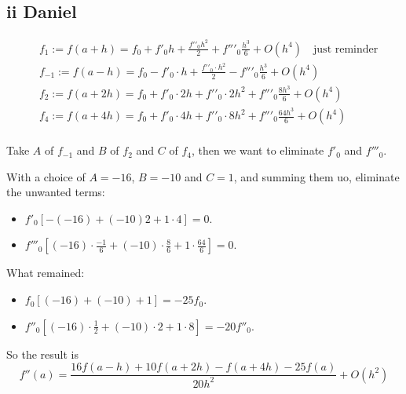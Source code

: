 \documentclass{article}
\begin{document}
\subsection{ii Daniel}

\begin{align}
     & {{f}_{1}}:=f\left( a+h \right)={{f}_{0}}+f{{'}_{0}}h+\frac{f'{{'}_{0}}{{h}^{2}}}{2}+f''{{'}_{0}}\frac{{{h}^{3}}}{6}+O\left( {{h}^{4}} \right)\quad \text{just reminder} \\
     & {{f}_{-1}}:=f\left( a-h \right)={{f}_{0}}-f{{'}_{0}}\cdot h+\frac{f'{{'}_{0}}\cdot {{h}^{2}}}{2}-f''{{'}_{0}}\frac{{{h}^{3}}}{6}+O\left( {{h}^{4}} \right)              \\
     & {{f}_{2}}:=f\left( a+2h \right)={{f}_{0}}+f{{'}_{0}}\cdot 2h+f'{{'}_{0}}\cdot 2{{h}^{2}}+f''{{'}_{0}}\frac{8{{h}^{3}}}{6}+O\left( {{h}^{4}} \right)                     \\
     & {{f}_{4}}:=f\left( a+4h \right)={{f}_{0}}+f{{'}_{0}}\cdot 4h+f'{{'}_{0}}\cdot 8{{h}^{2}}+f''{{'}_{0}}\frac{64{{h}^{3}}}{6}+O\left( {{h}^{4}} \right)                    \\
\end{align}

Take $A$ of $f_{-1}$ and $B$ of $f_{2}$ and $C$ of $f_4$,
then we want to eliminate $f'_0$ and $f'''_0$.

With a choice of $A=-16$, $B=-10$ and $C=1$, and summing them uo, eliminate the unwanted terms:
\begin{itemize}
    \item $f'_0 [-(-16) + (-10)2 + 1\cdot 4] = 0$.
    \item $f'''_0 [(-16)\cdot \frac{-1}{6} + (-10)\cdot \frac{8}{6} + 1\cdot \frac{64}{6}] = 0$.
\end{itemize}
What remained:
\begin{itemize}
    \item $f_0 [(-16) + (-10) + 1] = -25f_0$.
    \item $f''_0 [(-16)\cdot \frac{1}{2} + (-10)\cdot 2 + 1\cdot 8] = -20f''_0$.
\end{itemize}

So the result is
\[f''\left( a \right)=\frac{16f\left( a-h \right)+10f\left( a+2h \right)-f\left( a+4h \right)-25f\left( a \right)}{20{{h}^{2}}}+O\left( {{h}^{2}} \right)\]
\end{document}

